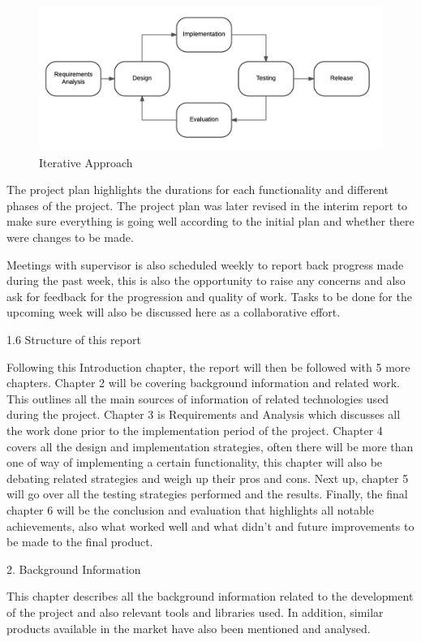 \documentclass{article}
\begin{document}
\begin{flushleft}
\begin{figure}[H]
	\centering
	\includegraphics[width=14cm]{iterative-plan}
	\caption{Iterative Approach}
	\label{fig:iterative-plan}
\end{figure}
The project plan highlights the durations for each functionality and different phases of the project. The project plan was later revised in the interim report to make sure everything is going well according to the initial plan and whether there were changes to be made.\par
Meetings with supervisor is also scheduled weekly to report back progress made during the past week, this is also the opportunity to raise any concerns and also ask for feedback for the progression and quality of work. Tasks to be done for the upcoming week will also be discussed here as a collaborative effort.\par
{\Large 1.6 Structure of this report}\par
Following this Introduction chapter, the report will then be followed with 5 more chapters. Chapter 2 will be covering background information and related work. This outlines all the main sources of information of related technologies used during the project. Chapter 3 is Requirements and Analysis which discusses all the work done prior to the implementation period of the project. Chapter 4 covers  all the design and implementation strategies, often there will be more than one of way of implementing a certain functionality, this chapter will also be debating related strategies and weigh up their pros and cons. Next up, chapter 5 will go over all the testing strategies performed and the results. Finally, the final chapter 6 will be the conclusion and evaluation that highlights all notable achievements, also what worked well and what didn't and future improvements to be made to the final product.\par
\newpage
{\huge 2. Background Information}\par
This chapter describes all the background information related to the development of the project and also relevant tools and libraries used. In addition, similar products available in the market have also been mentioned and analysed.\par

\end{flushleft}
\end{document}
